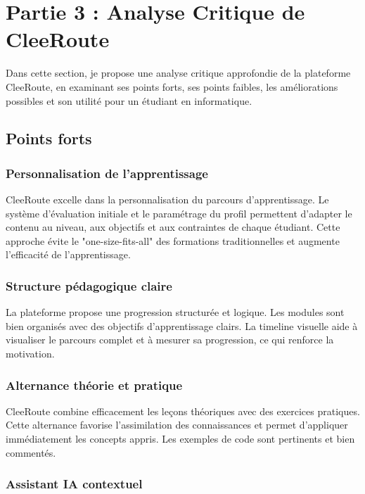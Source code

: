 \documentclass[12pt,a4paper]{article}
\begin{document}
\newpage

\section{Partie 3 : Analyse Critique de CleeRoute}

Dans cette section, je propose une analyse critique approfondie de la plateforme CleeRoute, en examinant ses points forts, ses points faibles, les améliorations possibles et son utilité pour un étudiant en informatique.

\subsection{Points forts}

\subsubsection{Personnalisation de l'apprentissage}

CleeRoute excelle dans la personnalisation du parcours d'apprentissage. Le système d'évaluation initiale et le paramétrage du profil permettent d'adapter le contenu au niveau, aux objectifs et aux contraintes de chaque étudiant. Cette approche évite le "one-size-fits-all" des formations traditionnelles et augmente l'efficacité de l'apprentissage.

\subsubsection{Structure pédagogique claire}

La plateforme propose une progression structurée et logique. Les modules sont bien organisés avec des objectifs d'apprentissage clairs. La timeline visuelle aide à visualiser le parcours complet et à mesurer sa progression, ce qui renforce la motivation.

\subsubsection{Alternance théorie et pratique}

CleeRoute combine efficacement les leçons théoriques avec des exercices pratiques. Cette alternance favorise l'assimilation des connaissances et permet d'appliquer immédiatement les concepts appris. Les exemples de code sont pertinents et bien commentés.

\subsubsection{Assistant IA contextuel}
\end{document}
